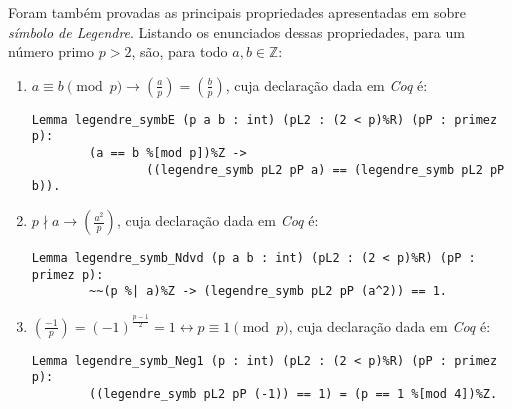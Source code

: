 Foram também provadas as principais propriedades apresentadas em \cite[p.~87-88]{book:2399854} sobre \textit{símbolo de Legendre}. Listando os enunciados dessas propriedades, para um número primo $p > 2$, são, para todo $a, b \in \mathbb{Z}$:
        \begin{enumerate}
        \item $a \equiv b \pmod{p} \rightarrow \left(\frac{a}{p}\right) = \left(\frac{b}{p}\right)$, cuja declaração dada em \textit{Coq} é:
        \newline
                \begin{lstlisting}[language=coq,frame=single,tabsize=1]
Lemma legendre_symbE (p a b : int) (pL2 : (2 < p)%R) (pP : primez p):
        (a == b %[mod p])%Z -> 
                ((legendre_symb pL2 pP a) == (legendre_symb pL2 pP b)).
                \end{lstlisting}
        
        \item $p \nmid a \rightarrow \left(\frac{a^2}{p}\right)$, cuja declaração dada em \textit{Coq} é:
        \newline
                \begin{lstlisting}[language=coq,frame=single,tabsize=1]
Lemma legendre_symb_Ndvd (p a b : int) (pL2 : (2 < p)%R) (pP : primez p):
        ~~(p %| a)%Z -> (legendre_symb pL2 pP (a^2)) == 1.
                \end{lstlisting}
        
        \item $\left(\frac{-1}{p}\right) = (-1)^{\frac{p - 1}{2}} = 1 \leftrightarrow p \equiv 1 \pmod{p}$, cuja declaração dada em \textit{Coq} é:
        \newline
                \begin{lstlisting}[language=coq,frame=single,tabsize=1]
Lemma legendre_symb_Neg1 (p : int) (pL2 : (2 < p)%R) (pP : primez p):
        ((legendre_symb pL2 pP (-1)) == 1) = (p == 1 %[mod 4])%Z.
                \end{lstlisting}
        

\end{enumerate}

